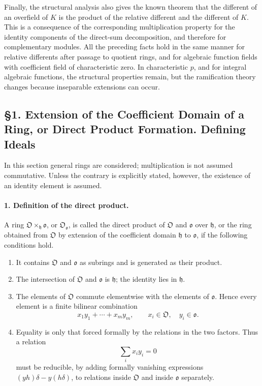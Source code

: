 \documentclass[11pt]{article}
\begin{document}
Finally, the structural analysis also gives the known theorem that the different of an overfield of $K$ is the product of the relative different and the different of $K$. This is a consequence of the corresponding multiplication property for the identity components of the direct-sum decomposition, and therefore for complementary modules. All the preceding facts hold in the same manner for relative differents after passage to quotient rings, and for algebraic function fields with coefficient field of characteristic zero. In characteristic $p$, and for integral algebraic functions, the structural properties remain, but the ramification theory changes because inseparable extensions can occur.

\subsection*{§1. Extension of the Coefficient Domain of a Ring, or Direct Product Formation. Defining Ideals}

In this section general rings are considered; multiplication is not assumed commutative. Unless the contrary is explicitly stated, however, the existence of an identity element is assumed.

\paragraph{1. Definition of the direct product.}
A ring $\mathfrak O\times_{\mathfrak h}\mathfrak o$, or $\mathfrak O_{\mathfrak o}$, is called the direct product of $\mathfrak O$ and $\mathfrak o$ over $\mathfrak h$, or the ring obtained from $\mathfrak O$ by extension of the coefficient domain $\mathfrak h$ to $\mathfrak o$, if the following conditions hold.

\begin{enumerate}
\item It contains $\mathfrak O$ and $\mathfrak o$ as subrings and is generated as their product.
\item The intersection of $\mathfrak O$ and $\mathfrak o$ is $\mathfrak h$; the identity lies in $\mathfrak h$.
\item The elements of $\mathfrak O$ commute elementwise with the elements of $\mathfrak o$. Hence every element is a finite bilinear combination
\[
        x_1y_1+\cdots+x_my_m,
        \qquad x_i\in\mathfrak O,
        \quad y_i\in\mathfrak o.
\]
\item Equality is only that forced formally by the relations in the two factors. Thus a relation
\[
        \sum_i x_i y_i=0
\]
must be reducible, by adding formally vanishing expressions $(yh)\delta-y(h\delta)$, to relations inside $\mathfrak O$ and inside $\mathfrak o$ separately.
\end{enumerate}
\end{document}

